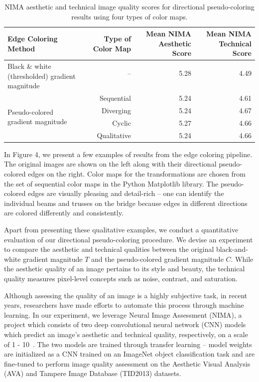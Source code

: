 \documentclass{article}
\begin{document}
\begin{table}[t]
\centering
\begin{tabular}{ l  r  r  r }  
\toprule
\textbf{Edge Coloring Method}  &  \textbf{Type of Color Map}  &  \textbf{Mean NIMA Aesthetic Score}  &  \textbf{Mean NIMA Technical Score}  \\
\midrule
\multirow{2}{*}{\parbox{4cm}{Black \& white (thresholded) gradient magnitude}}    &   --         &   5.28    &   4.49  \\
\\
\midrule
\multirow{4}{*}{\parbox{3.5cm}{Pseudo-colored gradient magnitude}}                &   Sequential  &   5.24    &   4.61  \\
                                                  &   Diverging   &   5.24    &   4.67  \\
                                                  &   Cyclic      &   5.27    &   4.66  \\
                                                  &   Qualitative &   5.24    &   4.66  \\
\bottomrule
\end{tabular}
\caption{NIMA aesthetic and technical image quality scores for directional pseudo-coloring results using four types of color maps.}
\end{table}

In Figure 4, we present a few examples of results from the edge coloring pipeline. The original images are shown on the left along with their directional pseudo-colored edges on the right. Color maps for the transformations are chosen from the set of sequential color maps in the Python Matplotlib library. The pseudo-colored edges are visually pleasing and detail-rich -- one can identify the individual beams and trusses on the bridge because edges in different directions are colored differently and consistently.

Apart from presenting these qualitative examples, we conduct a quantitative evaluation of our directional pseudo-coloring procedure. We devise an experiment to compare the aesthetic and technical qualities between the original black-and-white gradient magnitude $T$ and the pseudo-colored gradient magnitude $C$. While the aesthetic quality of an image pertains to its style and beauty, the technical quality measures pixel-level concepts such as noise, contrast, and saturation.

Although assessing the quality of an image is a highly subjective task, in recent years, researchers have made efforts to automate this process through machine learning. In our experiment, we leverage Neural Image Assessment (NIMA), a project which consists of two deep convolutional neural network (CNN) models which predict an image’s aesthetic and technical quality, respectively, on a scale of 1 - 10~\cite{idealods2018imagequalityassessment,nima}. The two models are trained through transfer learning -- model weights are initialized as a CNN trained on an ImageNet object classification task and are fine-tuned to perform image quality assessment on the Aesthetic Visual Analysis (AVA) and Tampere Image Database (TID2013) datasets.
\end{document}
